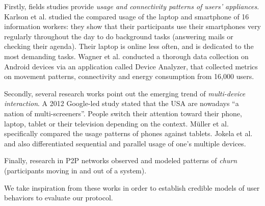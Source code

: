 Firstly, fields studies provide \emph{usage and connectivity patterns of users' appliances}.
Karlson et al. \cite{Karlson_Meyers_Jacobs_Johns_Kane_2009} studied the compared usage of the laptop and smartphone of 16 information workers: 
they show that their participants use their smartphones very regularly throughout the day to do background tasks (\eg answering mails or checking their agenda).
Their laptop is online less often, and is dedicated to the most demanding tasks.
Wagner et al. \cite{Wagner_Rice_Beresford_2013} conducted a thorough data collection on Android devices via an application called Device Analyzer, that collected metrics on movement patterns, connectivity and energy consumption from 16,000 users.

Secondly, several research works point out the emerging trend of \emph{multi-device interaction}.
A 2012 Google-led study \cite{google2012} stated that the USA are nowadays ``a nation of multi-screeners''.
People switch their attention toward their phone, laptop, tablet or their television depending on the context.
M\"uller et al. \cite{Muller_Gove_Webb_Cheang_2015} specifically compared the usage patterns of phones against tablets.
Jokela et al. \cite{Jokela_Ojala_Olsson_2015} and \cite{google2012} also differentiated sequential and parallel usage of one's multiple devices.

Finally, research in P2P networks observed \cite{Stutzbach_Rejaie_2006} and modeled \cite{Yao_Leonard_Wang_Loguinov_2006} patterns of \emph{churn} (\ie participants moving in and out of a system).

We take inspiration from these works in order to establish credible models of user behaviors to evaluate our protocol. 


